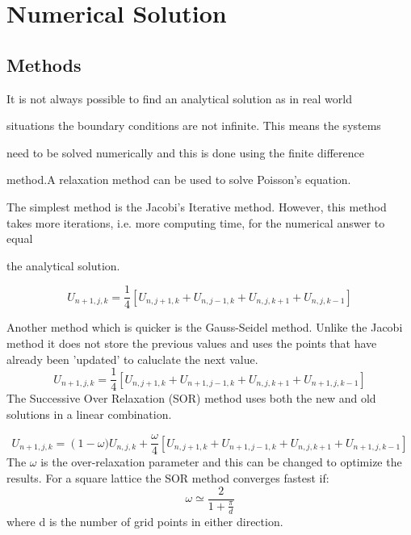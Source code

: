 \documentclass{article}
\begin{document}
	\section{Numerical Solution}
	
	\subsection{Methods}
	It is not always possible to find an analytical solution as in real world
	

	situations the boundary conditions are not infinite. This means the systems
	

	need to be solved numerically and this is done using the finite difference
	

	method.A relaxation method can be used to solve Poisson's equation.
	

	


	

	The simplest method is the Jacobi's Iterative method. However, this method takes more iterations, i.e. more computing time, for the numerical answer to equal
	

	the analytical solution.
	

	


	

	\begin{equation} U_{n+1,j,k}=\frac{1}{4}\left [ U_{n,j+1,k} + U_{n,j-1,k} + U_{n,j,k+1} +U_{n,j,k-1}\right ]	
	\end{equation}
	
	Another method which is quicker is the Gauss-Seidel method. Unlike the Jacobi method it does not store the previous values and uses the points that have already been 'updated' to caluclate the next value.
	\begin{equation} 
	U_{n+1,j,k}=\frac{1}{4}\left [ U_{n,j+1,k} + U_{n+1,j-1,k} + U_{n,j,k+1} +U_{n+1,j,k-1}\right ]
	\end{equation}
	The Successive Over Relaxation (SOR) method uses both the new and old solutions in a linear combination.
	
	\begin{equation} 
	U_{n+1,j,k}=\left (1-\omega)\right. U_{n,j,k}+\frac{\omega}{4}\left [ U_{n,j+1,k} + U_{n+1,j-1,k} + U_{n,j,k+1} +U_{n+1,j,k-1}\right ]
	\end{equation}
	The $\omega$ is the over-relaxation parameter and this can be changed to optimize the results. For a square lattice the SOR method converges fastest if:
	\begin{equation}
	\omega \simeq \frac{2}{1 + \frac{\pi}{d}}
	\end{equation}
	where d is the number of grid points in either direction. \cite{numericalmethods}
\end{document}
